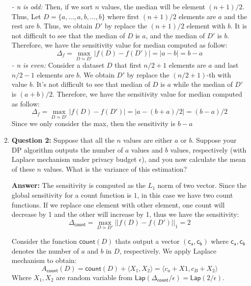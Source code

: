 \documentclass{article}
\newcommand{\ans}[1]{\begin{mdframed}\textbf{Answer: }#1\end{mdframed}}
\begin{document}
\begin{enumerate}
{\begin{enumerate}
    \textit{- n is odd: } Then, if we sort $n$ values, the median will be element $(n+1)/2$. Thus, Let $D=\{a,..., a,b,...,b\}$ where first $(n+1)/2$ elements are $a$ and the rest are $b$. Thus, we obtain $D'$ by replace the $(n+1)/2$ element with $b$. It is not difficult to see that the median of $D$ is $a$,  and the median of $D'$ is $b$. Therefore, we have the sensitivity value for median computed as follow:
        \begin{equation}
			\Delta_f  = \max_{D\simeq D'} |f(D) - f(D')| =|a-b|= b-a
        \end{equation} 
        \textit{- n is even:} Consider a dataset $D$ that first $n/2+1$ elements are $a$ and last $n/2-1$ elements are $b$. We obtain $D'$ by replace the $(n/2+1)$-th with value $b$. It's not difficult to see that median of $D$ is $a$ while the median of $D'$ is $(a+b)/2$. Therefore,  we have the sensitivity value for median computed as follow:
        \begin{equation}
			\Delta_f  = \max_{D\simeq D'} |f(D) - f(D')| =|a-(b+a)/2|= (b-a)/2
        \end{equation}
        Since we only consider the max, then the sensitivity is $b-a$
	\end{enumerate}
	}
	\item[]\textbf{Question 2:} Suppose that all the $n$ values are either $a$ or $b$. Suppose your DP algorithm outputs the number of $a$ values and $b$ values, respectively (with Laplace mechanism under privacy budget $\epsilon$), and you now calculate the mean of these $n$ values. What is the variance of this estimation?
	\ans{
		The sensitivity is computed as the $L_1$ norm of two vector. Since the global sensitivity for a count function is $1$, in this case we have two count functions. If we replace one element with other element, one count will decrease by 1 and the other will increase by 1, thus we have the sensitivity:
		\begin{equation}\label{eq:globalsensitivity1}
			\Delta_\mathsf{count}  = \max_{D\simeq D'} ||f(D) - f(D')||_1 = 2 
		\end{equation}
		
		Consider the function $\mathsf{count}(D)$ thats output a vector $(\mathsf{c_a,c_b})$ where $\mathsf{c_a,c_b}$ denotes the number of $a$ and $b$ in $D$, respectively.
		We apply Laplace mechanism to obtain: 
		$$A_{\mathsf{count}}(D) = \mathsf{count}(D) + \langle X_1,X_2\rangle = \langle c_a+X1,c_B+X_2 \rangle$$ 
		Where $X_1,X_2$ are random variable from $\mathsf{Lap}(\Delta_\mathsf{count}/\epsilon) = \mathsf{Lap}(2/\epsilon)$.

}
\end{enumerate}
\end{document}

